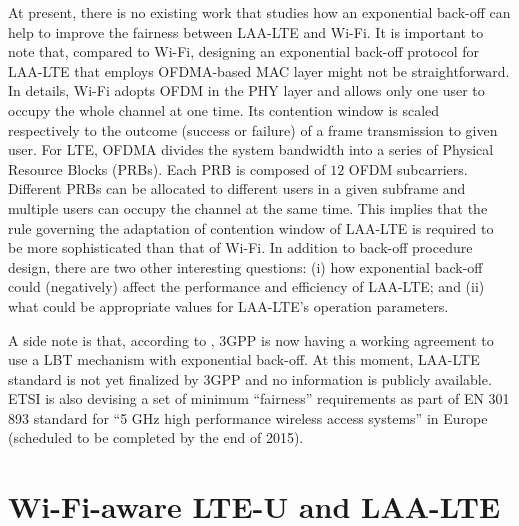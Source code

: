 At present, there is no existing work that studies how an exponential back-off can help to improve the fairness between \mbox{LAA-LTE} and \mbox{Wi-Fi}. It is important to note that, compared to \mbox{Wi-Fi}, designing an exponential back-off protocol for \mbox{LAA-LTE} that employs OFDMA-based MAC layer might not be straightforward. In details, \mbox{Wi-Fi} adopts OFDM in the PHY layer and allows only one user to occupy the whole channel at one time. Its contention window is scaled respectively to the outcome (success or failure) of a frame transmission to given user. For LTE, OFDMA divides the system bandwidth into a series of Physical Resource Blocks (PRBs). Each PRB is composed of $12$ OFDM subcarriers. Different PRBs can be allocated to different users in a given subframe and multiple users can occupy the channel at the same time. This implies that the rule governing the adaptation of contention window of \mbox{LAA-LTE} is required to be more sophisticated than that of \mbox{Wi-Fi}. In addition to back-off procedure design, there are two other interesting questions: (i) how exponential back-off could (negatively) affect the performance and efficiency of \mbox{LAA-LTE}; and (ii) what could be appropriate values for \mbox{LAA-LTE}'s operation parameters.

A side note is that, according to \cite{U-LTE-FCC-Cisco-2015}, 3GPP is now having a working agreement to use a LBT mechanism with exponential back-off. At this moment, \mbox{LAA-LTE} standard is not yet finalized by 3GPP and no information is publicly available. ETSI is also devising a set of minimum ``fairness'' requirements as part of EN 301 893 standard for ``5 GHz high performance wireless access systems'' in Europe (scheduled to be completed by the end of 2015).

\section{Wi-Fi-aware LTE-U and LAA-LTE}
\label{subsection:Wi-Fi-aware}

